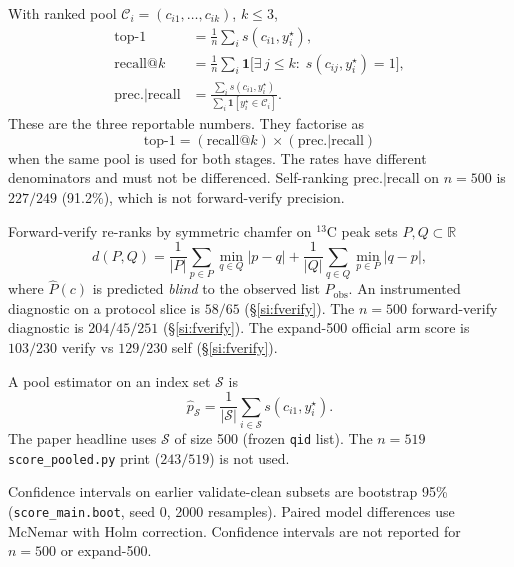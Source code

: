 With ranked pool $\mathcal{C}_i=(c_{i1},\ldots,c_{ik})$, $k\leq 3$,
\begin{align}
\label{si:eq:top1}
\mathrm{top\text{-}1}
&=\frac1n\sum_i s(c_{i1}, y_i^\star),\\
\label{si:eq:recall}
\mathrm{recall}@k
&=\frac1n\sum_i \mathbf{1}\big[\exists\,j\leq k:\; s(c_{ij}, y_i^\star)=1\big],\\
\label{si:eq:prec}
\mathrm{prec.}|\mathrm{recall}
&=\frac{\sum_i s(c_{i1}, y_i^\star)}{\sum_i \mathbf{1}[y_i^\star\in\mathcal{C}_i]}.
\end{align}
These are the three reportable numbers. They factorise as
\begin{equation}
\label{si:eq:factor}
\mathrm{top\text{-}1}
=(\mathrm{recall}@k)\times(\mathrm{prec.}|\mathrm{recall})
\end{equation}
when the same pool is used for both stages. The rates have different
denominators and must not be differenced.
Self-ranking $\mathrm{prec.}|\mathrm{recall}$ on $n{=}500$ is $227/249$
(91.2\%), which is not forward-verify precision.

Forward-verify re-ranks by symmetric chamfer on $^{13}$C peak sets
$P,Q\subset\mathbb{R}$
\begin{equation}
\label{si:eq:chamfer}
d(P,Q)
=\frac1{|P|}\sum_{p\in P}\min_{q\in Q}|p-q|
+\frac1{|Q|}\sum_{q\in Q}\min_{p\in P}|q-p|,
\end{equation}
where $\hat P(c)$ is predicted \emph{blind} to the observed list $P_{\mathrm{obs}}$.
An instrumented diagnostic on a protocol slice is $58/65$
(\S\ref{si:fverify}).
The $n{=}500$ forward-verify diagnostic is $204/45/251$
(\S\ref{si:fverify}).
The expand-500 official arm score is $103/230$ verify vs $129/230$ self
(\S\ref{si:fverify}).

A pool estimator on an index set $\mathcal{S}$ is
\begin{equation}
\label{si:eq:pool}
\hat p_{\mathcal{S}}
=\frac{1}{|\mathcal{S}|}\sum_{i\in\mathcal{S}} s(c_{i1}, y_i^\star).
\end{equation}
The paper headline uses $\mathcal{S}$ of size 500 (frozen \texttt{qid} list).
The $n{=}519$ \texttt{score\_pooled.py} print ($243/519$) is not used.

Confidence intervals on earlier validate-clean subsets are bootstrap
95\% (\texttt{score\_main.boot}, seed 0, 2000 resamples).
Paired model differences use McNemar with Holm correction.
Confidence intervals are not reported for $n{=}500$ or expand-500.

